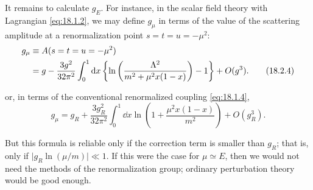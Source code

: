 It remains to calculate $g_E$. For instance, in the scalar field theory with
Lagrangian \eqref{eq:18.1.2}, we may define $g_\mu$ in terms of the value of
the scattering amplitude at a renormalization point
$s=t=u=-\mu^2$:
\begin{align}
g_\mu&\equiv A(s=t=u=-\mu^2)\notag\\
&=g-\frac{3g^2}{32\pi^2}\int_0^1\mathop{}\!\mathrm{d} x
\left\{\ln\left(\frac{\Lambda^2}{m^2+\mu^2x(1-x)}\right)-1\right\}
+O(g^3).
\tag{18.2.4}\label{eq:18.2.4}
\end{align}
\par\noindent
or, in terms of the conventional renormalized coupling \eqref{eq:18.1.4},
\begin{equation}
g_\mu=g_R+\frac{3g_R^2}{32\pi^2}\int_0^1\dd x
\ln\left(1+\frac{\mu^2x(1-x)}{m^2}\right)+O(g_R^3).
\tag{18.2.5}\label{eq:18.2.5}
\end{equation}
\par\noindent
But this formula is reliable only if the correction term is smaller than
$g_R$; that is, only if $\lvert g_R\ln(\mu/m)\rvert\ll1$. If this were the
case for $\mu\simeq E$, then we would not need the methods of the
renormalization group; ordinary perturbation theory would be good enough.

